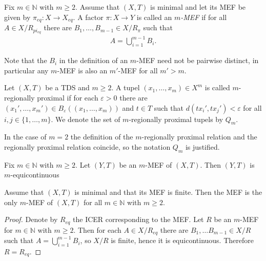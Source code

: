 \begin{definition}[$m$-MEF]
	Fix $m \in \mathbb{N}$ with $m \geq 2$. Assume that $(X, T)$ is minimal and let its MEF be given by $\pi_{eq}: X \to X_{eq}$. A factor $\pi: X \to Y$ is called an \emph{$m$-MEF} if for all $A \in X/R_{pi_{eq}}$ there are $B_1, \dots, B_{m-1} \in X/R_\pi$ such that
	\begin{align*}
		A = \bigcup_{i=1}^{m-1} B_i.
	\end{align*}
\end{definition}

\begin{remark}
	Note that the $B_i$ in the definition of an $m$-MEF need not be pairwise distinct, in particular any $m$-MEF is also an $m'$-MEF for all $m' > m$.
\end{remark}

\begin{definition}
	Let $(X, T)$ be a TDS and $m \geq 2$.
	A tupel $(x_1, \dots, x_m) \in X^m$ is called $m$-regionally proximal if for each $\varepsilon > 0$
	there are $(x_1', \dots, x_m') \in B_\varepsilon((x_1, \dots, x_m))$ and $t \in T$ such that $d(tx_i', tx_j') < \varepsilon$ for all $i, j \in \{1, \dots, m\}$.
	We denote the set of $m$-regionally proximal tupels by $Q_m$.
\end{definition}

\begin{remark}
	In the case of $m = 2$ the definition of the $m$-regionally proximal relation and the regionally proximal relation coincide,
	so the notation $Q_m$ is justified.
\end{remark}

\begin{proposition}
	Fix $m \in \mathbb{N}$ with $m \geq 2$. Let $(Y, T)$ be an $m$-MEF of $(X, T)$. Then $(Y, T)$ is $m$-equicontinuous
\end{proposition}

\begin{proposition}
	Assume that $(X, T)$ is minimal and that its MEF is finite. Then the MEF is the only $m$-MEF of $(X, T)$ for all $m \in \mathbb{N}$ with $m \geq 2$.
\end{proposition}
\begin{proof}
	Denote by $R_{eq}$ the ICER corresponding to the MEF. Let $R$ be an $m$-MEF for $m \in \mathbb{N}$ with $m \geq 2$. Then for each $A \in X/R_{eq}$ there are $B_1, \dots B_{m-1} \in X/R$ such that $A = \bigcup_{i=1}^{m-1} B_i$, so $X/R$ is finite, hence it is equicontinuous. Therefore $R = R_{eq}$.
\end{proof}

